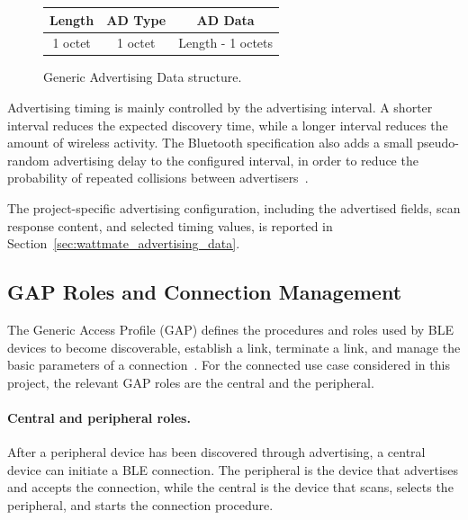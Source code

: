 \begin{figure}[H]
	\centering
	\small
	\renewcommand{\arraystretch}{1.25}
	\begin{tabular}{|c|c|c|}
		\hline
		\textbf{Length} & \textbf{AD Type} & \textbf{AD Data} \\
		\hline
		1 octet & 1 octet & Length - 1 octets \\
		\hline
	\end{tabular}
	\caption{Generic Advertising Data structure.}
	\label{fig:ble_ad_structure}
\end{figure}


Advertising timing is mainly controlled by the advertising interval. 
A shorter interval reduces the expected discovery time, while a longer interval reduces the amount of wireless activity. 
The Bluetooth specification also adds a small pseudo-random advertising delay to the configured interval, in order to reduce the probability of repeated collisions between advertisers~\cite{bluetooth_core_link_layer}.

The project-specific advertising configuration, including the advertised fields, scan response content, and selected timing values, is reported in Section~\ref{sec:wattmate_advertising_data}.





\subsection{GAP Roles and Connection Management}
\label{sec:ble_connection_roles}

The Generic Access Profile (GAP) defines the procedures and roles used by BLE devices to become discoverable, establish a link, terminate a link, and manage the basic parameters of a connection~\cite{bluetooth_core_gap}. 
For the connected use case considered in this project, the relevant GAP roles are the central and the peripheral.

\paragraph{Central and peripheral roles.}
After a peripheral device has been discovered through advertising, a central device can initiate a BLE connection. 
The peripheral is the device that advertises and accepts the connection, while the central is the device that scans, selects the peripheral, and starts the connection procedure.

